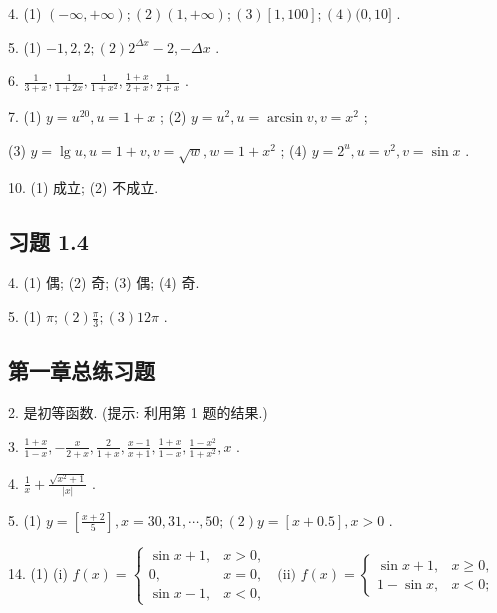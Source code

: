 4. (1) \(\left( {-\infty , + \infty }\right) ;\left( 2\right) \left( {1, + \infty }\right) ;\left( 3\right) \left\lbrack  {1,{100}}\right\rbrack  ;\left( 4\right) (0,{10}\rbrack\) .

5. (1) \(- 1,2,2;\left( 2\right) {2}^{\Delta x} - 2, - {\Delta x}\) .

6. \(\frac{1}{3 + x},\frac{1}{1 + {2x}},\frac{1}{1 + {x}^{2}},\frac{1 + x}{2 + x},\frac{1}{2 + x}\) .

7. (1) \(y = {u}^{20},u = 1 + x\) ; (2) \(y = {u}^{2},u = \arcsin v,v = {x}^{2}\) ;

(3) \(y = \lg u,u = 1 + v,v = \sqrt{w},w = 1 + {x}^{2}\) ; (4) \(y = {2}^{u},u = {v}^{2},v = \sin x\) .

10. (1) 成立; (2) 不成立.

\subsection{习题 1.4}

4. (1) 偶; (2) 奇; (3) 偶; (4) 奇.

5. (1) \(\pi ;\left( 2\right) \frac{\pi }{3};\left( 3\right) {12\pi }\) .

\subsection{第一章总练习题}

2. 是初等函数. (提示: 利用第 1 题的结果.)

3. \(\frac{1 + x}{1 - x}, - \frac{x}{2 + x},\frac{2}{1 + x},\frac{x - 1}{x + 1},\frac{1 + x}{1 - x},\frac{1 - {x}^{2}}{1 + {x}^{2}},x\) .

4. \(\frac{1}{x} + \frac{\sqrt{{x}^{2} + 1}}{\left| x\right| }\) .

5. (1) \(y = \left\lbrack  \frac{x + 2}{5}\right\rbrack  ,x = {30},{31},\cdots ,{50};\left( 2\right) y = \left\lbrack  {x + {0.5}}\right\rbrack  ,x > 0\) .

14. (1) (i) \(f\left( x\right)  = \left\{  {\begin{array}{ll} \sin x + 1, & x > 0, \\  0, & x = 0, \\  \sin x - 1, & x < 0, \end{array}\;\text{ (ii) }f\left( x\right)  = \left\{  \begin{array}{ll} \sin x + 1, & x \geq  0, \\  1 - \sin x, & x < 0; \end{array}\right. }\right.\)

